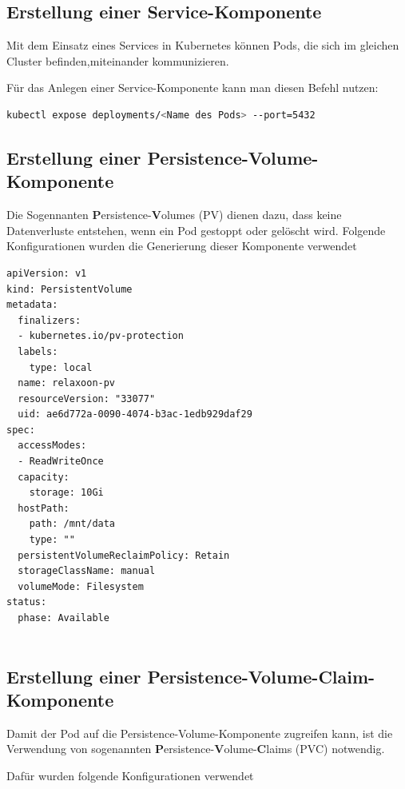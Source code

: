 \subsection{Erstellung einer Service-Komponente}

Mit dem Einsatz eines Services in Kubernetes können Pods,
die sich im gleichen Cluster befinden,miteinander kommunizieren. \cite{k8s-service}

Für das Anlegen einer Service-Komponente kann man diesen Befehl nutzen:

\begin{lstlisting}[language=bash,caption=create a service component]
kubectl expose deployments/<Name des Pods> --port=5432
\end{lstlisting}



\subsection{Erstellung einer Persistence-Volume-Komponente}

Die Sogennanten \textbf{P}ersistence-\textbf{V}olumes (PV) dienen dazu, dass keine Datenverluste entstehen, wenn ein Pod gestoppt oder gelöscht wird.
Folgende Konfigurationen wurden die Generierung dieser Komponente verwendet

\begin{lstlisting}[caption=PV.yml]
apiVersion: v1
kind: PersistentVolume
metadata:
  finalizers:
  - kubernetes.io/pv-protection
  labels:
    type: local
  name: relaxoon-pv
  resourceVersion: "33077"
  uid: ae6d772a-0090-4074-b3ac-1edb929daf29
spec:
  accessModes:
  - ReadWriteOnce
  capacity:
    storage: 10Gi
  hostPath:
    path: /mnt/data
    type: ""
  persistentVolumeReclaimPolicy: Retain
  storageClassName: manual
  volumeMode: Filesystem
status:
  phase: Available    
    
\end{lstlisting}


\subsection{Erstellung einer Persistence-Volume-Claim-Komponente}

Damit der Pod auf die Persistence-Volume-Komponente zugreifen kann, ist die Verwendung von
sogenannten \textbf{P}ersistence-\textbf{V}olume-\textbf{C}laims (PVC) notwendig.

Dafür wurden folgende Konfigurationen verwendet

